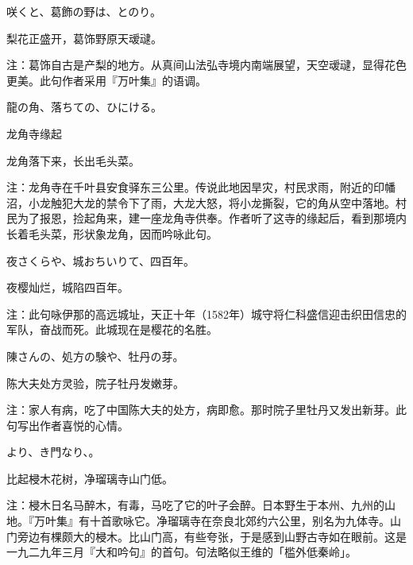 \begin{haiku}
    {\FH {}咲くと、葛飾の野は、とのり。}

    {\FK 梨花正盛开，葛饰野原天叆叇。}

    {\FT 注：葛饰自古是产梨的地方。从真间山法弘寺境内南端展望，天空叆叇，显得花色更美。此句作者采用『万叶集』的语调。}
\end{haiku}

\begin{haiku}
    {\FH 龍の角、落ちての、ひにける。}

    {\FK 龙角寺缘起}

    {\FK 龙角落下来，长出毛头菜。}

    {\FT 注：龙角寺在千叶县安食驿东三公里。传说此地因旱灾，村民求雨，附近的印幡沼，小龙触犯大龙的禁令下了雨，大龙大怒，将小龙撕裂，它的角从空中落地。村民为了报恩，捡起角来，建一座龙角寺供奉。作者听了这寺的缘起后，看到那境内长着毛头菜，形状象龙角，因而吟咏此句。}
\end{haiku}

\begin{haiku}
    {\FH 夜さくらや、城おちいりて、四百年。}

    {\FK 夜樱灿烂，城陷四百年。}

    {\FT 注：此句咏伊那的高远城址，天正十年（1582年）城守将仁科盛信迎击织田信忠的军队，奋战而死。此城现在是樱花的名胜。}
\end{haiku}

\begin{haiku}
    {\FH 陳さんの、処方の験や、牡丹の芽。}

    {\FK 陈大夫处方灵验，院子牡丹发嫩芽。}

    {\FT 注：家人有病，吃了中国陈大夫的处方，病即愈。那时院子里牡丹又发出新芽。此句写出作者喜悦的心情。}
\end{haiku}

\begin{haiku}
    {\FH {}より、き門なり、。}

    {\FK 比起梫木花树，净瑠璃寺山门低。}

    {\FT 注：梫木日名马醉木，有毒，马吃了它的叶子会醉。日本野生于本州、九州的山地。『万叶集』有十首歌咏它。净瑠璃寺在奈良北郊约六公里，别名为九体寺。山门旁边有棵颇大的梫木。比山门高，有些夸张，于是感到山野古寺如在眼前。这是一九二九年三月『大和吟句』的首句。句法略似王维的「槛外低秦岭」。}
\end{haiku}

